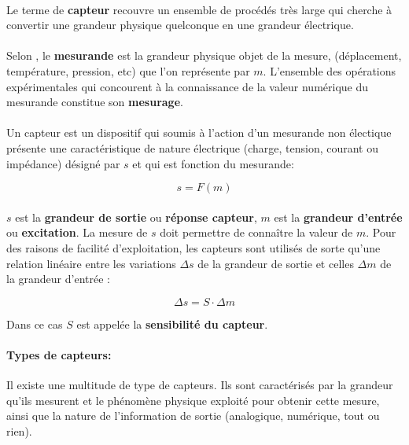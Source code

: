 \documentclass[12pt,a4paper]{report}
\begin{document}
\paragraph{}Le terme de \textbf{capteur} recouvre un ensemble de procédés très large qui cherche à convertir une grandeur physique quelconque en une grandeur électrique. 

\paragraph{} Selon \cite{asch_les_2010}, le \textbf{mesurande} est la grandeur physique objet de la mesure, (déplacement, température, pression, etc) que l'on représente par $m$. L'ensemble des opérations expérimentales qui concourent à la connaissance de la valeur numérique du mesurande constitue son \textbf{mesurage}.

\paragraph{}Un capteur est un dispositif qui soumis à l'action d'un mesurande non électique présente une caractéristique de nature électrique (charge, tension, courant ou impédance) désigné par $s$ et qui est fonction du mesurande:

\begin{equation}
	s = F(m)
\end{equation}

\paragraph{} $s$ est la \textbf{grandeur de sortie} ou \textbf{réponse capteur}, $m$ est la \textbf{grandeur d'entrée} ou \textbf{excitation}. La mesure de $s$ doit permettre de connaître la valeur de $m$. Pour des raisons de facilité d'exploitation, les capteurs sont utilisés de sorte qu'une relation linéaire entre les variations $\varDelta s$ de la grandeur de sortie et celles $\varDelta m$ de la grandeur d'entrée :

\begin{equation}
	\varDelta s = S \cdot \varDelta m
\end{equation}

Dans ce cas $S$ est appelée la \textbf{sensibilité du capteur}. 

\paragraph{Types de capteurs:} Il existe une multitude de type de capteurs. Ils sont caractérisés par la grandeur qu'ils mesurent et le phénomène physique exploité pour obtenir cette mesure, ainsi que la nature de l'information de sortie (analogique, numérique, tout ou rien).
\end{document}
